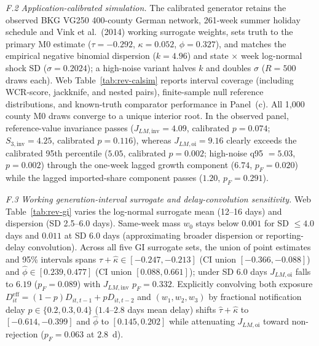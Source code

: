 

\emph{F.2 Application-calibrated simulation.} The calibrated generator retains the observed BKG
VG250 400-county German network, 261-week summer holiday schedule and Vink et al.\ (2014) working
surrogate weights, sets truth to the primary M0 estimate ($\tau=-0.292$, $\kappa=0.052$,
$\phi=0.327$), and matches the empirical negative binomial dispersion ($k=4.96$) and state $\times$
week log-normal shock SD ($\sigma=0.2024$); a high-noise variant halves $k$ and doubles $\sigma$
($R=500$ draws each). Web Table~\ref{tab:rev-calsim} reports interval coverage (including WCR-score,
jackknife, and nested pairs), finite-sample null reference distributions, and known-truth comparator
performance in Panel~(c). All 1{,}000 county M0 draws converge to a unique interior root. In the
observed panel, reference-value invariance passes ($J_{LM,\mathrm{inv}}=4.09$, calibrated $p=0.074$;
$S_{3,\mathrm{inv}}=4.25$, calibrated $p=0.116$), whereas $J_{LM,\mathrm{oi}}=9.16$ clearly exceeds
the calibrated 95th percentile ($5.05$, calibrated $p=0.002$; high-noise q95 $=5.03$, $p=0.002$)
through the one-week lagged growth component ($6.74$, $p_F=0.020$) while the lagged imported-share
component passes ($1.20$, $p_F=0.291$).



\emph{F.3 Working generation-interval surrogate and delay-convolution sensitivity.} Web Table~\ref{tab:rev-gi} varies
the log-normal surrogate mean (12--16 days) and dispersion (SD 2.5--6.0 days). Same-week mass
$w_0$ stays below $0.001$ for SD $\le 4.0$ days and $0.011$ at SD 6.0 days (approximating broader
dispersion or reporting-delay convolution). Across all five GI surrogate sets, the union of point
estimates and 95\% intervals spans $\hat\tau+\hat\kappa\in[-0.247,-0.213]$ (CI union
$[-0.366,-0.088]$) and $\hat\phi\in[0.239,0.477]$ (CI union $[0.088,0.661]$); under SD 6.0 days
$J_{LM,\mathrm{oi}}$ falls to $6.19$ ($p_F=0.089$) with $J_{LM,\mathrm{inv}}$ $p_F=0.332$. Explicitly
convolving both exposure $D_{it}^{\mathrm{eff}}=(1-p)D_{it,t-1}+pD_{it,t-2}$ and $(w_1,w_2,w_3)$ by
fractional notification delay $p\in\{0.2,0.3,0.4\}$ ($1.4$--$2.8$ days mean delay) shifts
$\hat\tau+\hat\kappa$ to $[-0.614,-0.399]$ and $\hat\phi$ to $[0.145,0.202]$ while attenuating
$J_{LM,\mathrm{oi}}$ toward non-rejection ($p_F=0.063$ at $2.8$~d).



